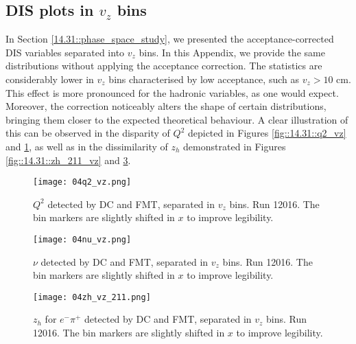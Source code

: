 \subsection{DIS plots in $v_z$ bins}
\label{20.04::dis_vz_plots}
    In Section \ref{14.31::phase_space_study}, we presented the acceptance-corrected DIS variables separated into $v_z$ bins.
    In this Appendix, we provide the same distributions without applying the acceptance correction.
    The statistics are considerably lower in $v_z$ bins characterised by low acceptance, such as $v_z > 10$ cm.
    This effect is more pronounced for the hadronic variables, as one would expect.
    Moreover, the correction noticeably alters the shape of certain distributions, bringing them closer to the expected theoretical behaviour.
    A clear illustration of this can be observed in the disparity of $Q^2$ depicted in Figures \ref{fig::14.31::q2_vz} and \ref{fig::20.04::q2_vz}, as well as in the dissimilarity of $z_h$ demonstrated in Figures \ref{fig::14.31::zh_211_vz} and \ref{fig::20.04::zh_211_vz}.


    \begin{figure}
        \centering
        \texttt{[image: 04q2\_vz.png]}
        \caption[$Q^2$ separated in $v_z$ bins]
        {$Q^2$ detected by DC and FMT, separated in $v_z$ bins.
        Run 12016.
        The bin markers are slightly shifted in $x$ to improve legibility.}
        \label{fig::20.04::q2_vz}
    \end{figure}

    \begin{figure}
        \centering
        \texttt{[image: 04nu\_vz.png]}
        \caption[$\nu$ separated in $v_z$ bins]
        {$\nu$ detected by DC and FMT, separated in $v_z$ bins.
        Run 12016.
        The bin markers are slightly shifted in $x$ to improve legibility.}
        \label{fig::20.04::nu_vz}
    \end{figure}

    \begin{figure}
        \centering
        \texttt{[image: 04zh\_vz\_211.png]}
        \caption[$z_h$ for $e^-\pi^+$ separated in $v_z$ bins]
        {$z_h$ for $e^-\pi^+$ detected by DC and FMT, separated in $v_z$ bins.
        Run 12016.
        The bin markers are slightly shifted in $x$ to improve legibility.}
        \label{fig::20.04::zh_211_vz}
    \end{figure}

